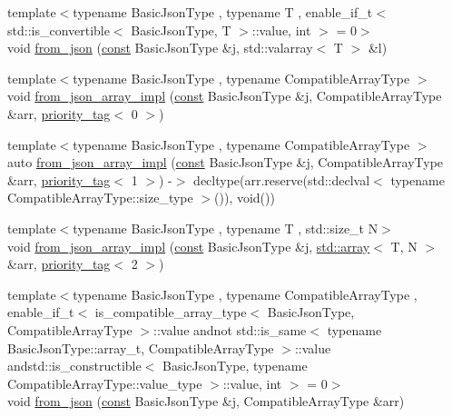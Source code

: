 \begin{DoxyCompactItemize}
\item 
{\footnotesize template$<$typename Basic\+Json\+Type , typename T , enable\+\_\+if\+\_\+t$<$ std\+::is\+\_\+convertible$<$ Basic\+Json\+Type, T $>$\+::value, int $>$  = 0$>$ }\\void \hyperlink{namespacenlohmann_1_1detail_a3df497b1d3977f071b488ecac1401517}{from\+\_\+json} (\hyperlink{functions__c_8js_afacfd9c985d225bb07483b887a801b6f}{const} Basic\+Json\+Type \&j, std\+::valarray$<$ T $>$ \&l)
\item 
{\footnotesize template$<$typename Basic\+Json\+Type , typename Compatible\+Array\+Type $>$ }\\void \hyperlink{namespacenlohmann_1_1detail_ac53673a5ce29fb69b96d41dad33cb3b0}{from\+\_\+json\+\_\+array\+\_\+impl} (\hyperlink{functions__c_8js_afacfd9c985d225bb07483b887a801b6f}{const} Basic\+Json\+Type \&j, Compatible\+Array\+Type \&arr, \hyperlink{structnlohmann_1_1detail_1_1priority__tag}{priority\+\_\+tag}$<$ 0 $>$)
\item 
{\footnotesize template$<$typename Basic\+Json\+Type , typename Compatible\+Array\+Type $>$ }\\auto \hyperlink{namespacenlohmann_1_1detail_a57f93ed57254a1639087cdc316e0fb83}{from\+\_\+json\+\_\+array\+\_\+impl} (\hyperlink{functions__c_8js_afacfd9c985d225bb07483b887a801b6f}{const} Basic\+Json\+Type \&j, Compatible\+Array\+Type \&arr, \hyperlink{structnlohmann_1_1detail_1_1priority__tag}{priority\+\_\+tag}$<$ 1 $>$) -\/$>$ decltype(arr.\+reserve(std\+::declval$<$ typename Compatible\+Array\+Type\+::size\+\_\+type $>$()), void())
\item 
{\footnotesize template$<$typename Basic\+Json\+Type , typename T , std\+::size\+\_\+t N$>$ }\\void \hyperlink{namespacenlohmann_1_1detail_a46b0781205d0bdc5a959343b389966a4}{from\+\_\+json\+\_\+array\+\_\+impl} (\hyperlink{functions__c_8js_afacfd9c985d225bb07483b887a801b6f}{const} Basic\+Json\+Type \&j, \hyperlink{namespacenlohmann_1_1detail_a1ed8fc6239da25abcaf681d30ace4985af1f713c9e000f5d3f280adbd124df4f5}{std\+::array}$<$ T, N $>$ \&arr, \hyperlink{structnlohmann_1_1detail_1_1priority__tag}{priority\+\_\+tag}$<$ 2 $>$)
\item 
{\footnotesize template$<$typename Basic\+Json\+Type , typename Compatible\+Array\+Type , enable\+\_\+if\+\_\+t$<$ is\+\_\+compatible\+\_\+array\+\_\+type$<$ Basic\+Json\+Type, Compatible\+Array\+Type $>$\+::value andnot std\+::is\+\_\+same$<$ typename Basic\+Json\+Type\+::array\+\_\+t, Compatible\+Array\+Type $>$\+::value andstd\+::is\+\_\+constructible$<$ Basic\+Json\+Type, typename Compatible\+Array\+Type\+::value\+\_\+type $>$\+::value, int $>$  = 0$>$ }\\void \hyperlink{namespacenlohmann_1_1detail_a8dcac00852dbe1f61d1e78135b19d428}{from\+\_\+json} (\hyperlink{functions__c_8js_afacfd9c985d225bb07483b887a801b6f}{const} Basic\+Json\+Type \&j, Compatible\+Array\+Type \&arr)

\end{DoxyCompactItemize}
